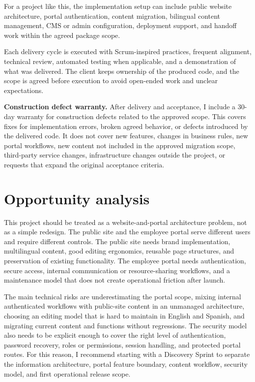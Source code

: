 \documentclass[11pt,a4paper]{article}
\begin{document}
For a project like this, the implementation setup can include public website architecture, portal authentication, content migration, bilingual content management, CMS or admin configuration, deployment support, and handoff work within the agreed package scope.\par

Each delivery cycle is executed with Scrum-inspired practices, frequent alignment, technical review, automated testing when applicable, and a demonstration of what was delivered. The client keeps ownership of the produced code, and the scope is agreed before execution to avoid open-ended work and unclear expectations.\par

\textbf{Construction defect warranty.} After delivery and acceptance, I include a 30-day warranty for construction defects related to the approved scope. This covers fixes for implementation errors, broken agreed behavior, or defects introduced by the delivered code. It does not cover new features, changes in business rules, new portal workflows, new content not included in the approved migration scope, third-party service changes, infrastructure changes outside the project, or requests that expand the original acceptance criteria.\par

\section*{Opportunity analysis}

This project should be treated as a website-and-portal architecture problem, not as a simple redesign. The public site and the employee portal serve different users and require different controls. The public site needs brand implementation, multilingual content, good editing ergonomics, reusable page structures, and preservation of existing functionality. The employee portal needs authentication, secure access, internal communication or resource-sharing workflows, and a maintenance model that does not create operational friction after launch.\par

The main technical risks are underestimating the portal scope, mixing internal authenticated workflows with public-site content in an unmanaged architecture, choosing an editing model that is hard to maintain in English and Spanish, and migrating current content and functions without regressions. The security model also needs to be explicit enough to cover the right level of authentication, password recovery, roles or permissions, session handling, and protected portal routes. For this reason, I recommend starting with a Discovery Sprint to separate the information architecture, portal feature boundary, content workflow, security model, and first operational release scope.\par
\end{document}
